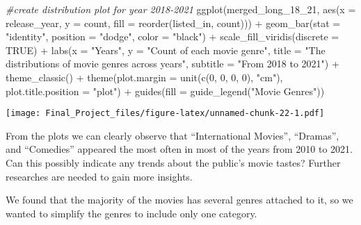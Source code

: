 \documentclass[
]{article}
\newenvironment{Shaded}{\begin{snugshade}}{\end{snugshade}}
\newcommand{\AttributeTok}[1]{\textcolor[rgb]{0.77,0.63,0.00}{#1}}
\newcommand{\CommentTok}[1]{\textcolor[rgb]{0.56,0.35,0.01}{\textit{#1}}}
\newcommand{\ConstantTok}[1]{\textcolor[rgb]{0.00,0.00,0.00}{#1}}
\newcommand{\DecValTok}[1]{\textcolor[rgb]{0.00,0.00,0.81}{#1}}
\newcommand{\FunctionTok}[1]{\textcolor[rgb]{0.00,0.00,0.00}{#1}}
\newcommand{\NormalTok}[1]{#1}
\newcommand{\SpecialCharTok}[1]{\textcolor[rgb]{0.00,0.00,0.00}{#1}}
\newcommand{\StringTok}[1]{\textcolor[rgb]{0.31,0.60,0.02}{#1}}
\begin{document}
\begin{Shaded}
\begin{Highlighting}[]
\CommentTok{\#create distribution plot for year 2018{-}2021}
\FunctionTok{ggplot}\NormalTok{(merged\_long\_18\_21, }\FunctionTok{aes}\NormalTok{(}\AttributeTok{x =}\NormalTok{ release\_year, }\AttributeTok{y =}\NormalTok{ count, }\AttributeTok{fill =} \FunctionTok{reorder}\NormalTok{(listed\_in, count))) }\SpecialCharTok{+} 
  \FunctionTok{geom\_bar}\NormalTok{(}\AttributeTok{stat =} \StringTok{"identity"}\NormalTok{,}
           \AttributeTok{position =} \StringTok{"dodge"}\NormalTok{,}
           \AttributeTok{color =} \StringTok{"black"}\NormalTok{) }\SpecialCharTok{+} 
  \FunctionTok{scale\_fill\_viridis}\NormalTok{(}\AttributeTok{discrete =} \ConstantTok{TRUE}\NormalTok{) }\SpecialCharTok{+}
  \FunctionTok{labs}\NormalTok{(}\AttributeTok{x =} \StringTok{"Years"}\NormalTok{,}
       \AttributeTok{y =} \StringTok{"Count of each movie genre"}\NormalTok{,}
       \AttributeTok{title =} \StringTok{"The distributions of movie genres across years"}\NormalTok{,}
       \AttributeTok{subtitle =} \StringTok{"From 2018 to 2021"}\NormalTok{) }\SpecialCharTok{+}
  \FunctionTok{theme\_classic}\NormalTok{() }\SpecialCharTok{+}
  \FunctionTok{theme}\NormalTok{(}\AttributeTok{plot.margin =} \FunctionTok{unit}\NormalTok{(}\FunctionTok{c}\NormalTok{(}\DecValTok{0}\NormalTok{, }\DecValTok{0}\NormalTok{, }\DecValTok{0}\NormalTok{, }\DecValTok{0}\NormalTok{), }\StringTok{"cm"}\NormalTok{),}
        \AttributeTok{plot.title.position =} \StringTok{"plot"}\NormalTok{) }\SpecialCharTok{+}
  \FunctionTok{guides}\NormalTok{(}\AttributeTok{fill =} \FunctionTok{guide\_legend}\NormalTok{(}\StringTok{"Movie Genres"}\NormalTok{))}
\end{Highlighting}
\end{Shaded}

\texttt{[image: Final\_Project\_files/figure-latex/unnamed-chunk-22-1.pdf]}

From the plots we can clearly observe that ``International Movies'',
``Dramas'', and ``Comedies'' appeared the most often in most of the
years from 2010 to 2021. Can this possibly indicate any trends about the
public's movie tastes? Further researches are needed to gain more
insights.

We found that the majority of the movies has several genres attached to
it, so we wanted to simplify the genres to include only one category.
\end{document}
